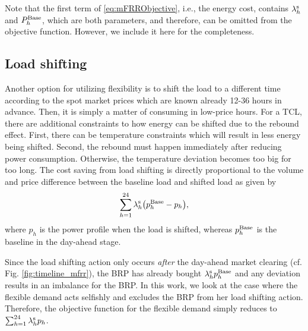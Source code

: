 Note that the first term of \eqref{eq:mFRRObjective}, i.e., the energy cost, contains $\lambda^{\rm{s}}_{h}$ and $P^{\rm{Base}}_{h}$, which are both parameters, and therefore, can be omitted from the objective function. However, we include it here for the completeness. 

\vspace{-2mm}
\subsection{Load shifting}
%
Another option for utilizing flexibility is to shift the load to a different time according to the spot market prices which are known already 12-36 hours in advance. Then, it is simply a matter of consuming in low-price hours.
%
For a TCL, there are additional constraints to how energy can be shifted due to the rebound effect. First, there can be temperature constraints which will result in less energy being shifted. Second, the rebound must happen immediately after reducing power consumption. Otherwise, the temperature deviation becomes too big for too long.
The cost saving from load shifting is directly proportional to the volume and price difference between the baseline load and shifted load as given by
%
\begin{equation}\label{eq:load_shifting_savings}
    \sum_{h=1}^{24} \lambda^{\rm{s}}_{h} \big(p^{\rm{Base}}_{h} -  p_{h}\big),
\end{equation}
%
where $p_{h}$ is the power profile when the load is shifted, whereas $p^{\rm{Base}}_{h}$ is the baseline in the day-ahead stage.

Since the load shifting action only occurs \textit{after} the day-ahead market clearing (cf. Fig. \ref{fig:timeline_mfrr}), the BRP has already bought $\lambda^{\rm{s}}_{h} p^{\rm{Base}}_{h}$ and any deviation results in an imbalance for the BRP. In this work, we look at the case where the flexible demand acts selfishly and excludes the BRP from her load shifting action. Therefore, the objective function for the flexible demand simply reduces to $\sum_{h=1}^{24} \lambda_{h}^{\rm{s}} p_{h}$.

